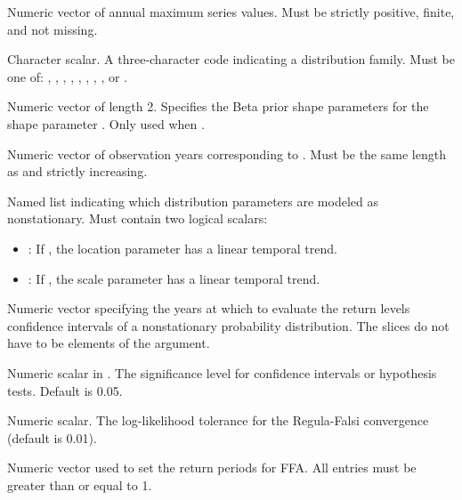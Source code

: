 \documentclass[a4paper]{book}
\begin{document}
\begin{Arguments}
\begin{ldescription}
\item[\code{data}] Numeric vector of annual maximum series values.
Must be strictly positive, finite, and not missing.

\item[\code{distribution}] Character scalar. A three-character code indicating
a distribution family. Must be one of: , , ,
, , , , , or .

\item[\code{prior}] Numeric vector of length 2. Specifies the Beta prior shape
parameters  for the shape parameter \eqn{\kappa}{}.
Only used when .

\item[\code{years}] Numeric vector of observation years corresponding to .
Must be the same length as  and strictly increasing.

\item[\code{structure}] Named list indicating which distribution parameters are
modeled as nonstationary. Must contain two logical scalars:
\begin{itemize}

\item{} : If , the location parameter has a linear temporal trend.
\item{} : If , the scale parameter has a linear temporal trend.

\end{itemize}


\item[\code{slices}] Numeric vector specifying the years at which to evaluate the
return levels confidence intervals of a nonstationary probability distribution.
The slices do not have to be elements of the  argument.

\item[\code{alpha}] Numeric scalar in \eqn{[0.01, 0.1]}{}. The significance
level for confidence intervals or hypothesis tests. Default is 0.05.

\item[\code{eps}] Numeric scalar. The log-likelihood tolerance for the Regula-Falsi
convergence (default is 0.01).

\item[\code{periods}] Numeric vector used to set the return periods for FFA.
All entries must be greater than or equal to 1.
\end{ldescription}
\end{Arguments}
\end{document}

